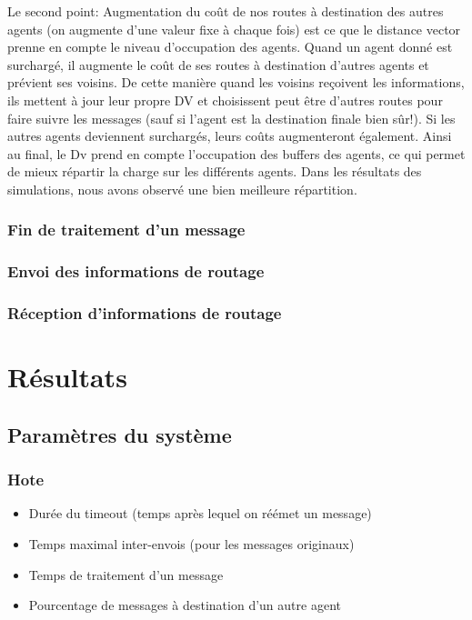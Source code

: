 \documentclass[a4paper,11pt]{article}
\begin{document}
Le second point: \og Augmentation du coût de nos routes à destination des autres agents (on augmente d'une valeur fixe à chaque fois) \fg est ce que le distance vector prenne en compte le niveau d'occupation des agents. Quand un agent donné est surchargé, il augmente le coût de ses routes à destination d'autres agents et prévient ses voisins. De cette manière quand les voisins reçoivent les informations, ils mettent à jour leur propre DV et choisissent peut être d'autres routes pour faire suivre les messages (sauf si l'agent est la destination finale bien sûr!). Si les autres agents deviennent surchargés, leurs coûts augmenteront également. Ainsi au final, le Dv prend en compte l'occupation des buffers des agents, ce qui permet de mieux répartir la charge sur les différents agents. Dans les résultats des simulations, nous avons observé une bien meilleure répartition.


\subsubsection{Fin de traitement d'un message}
\subsubsection{Envoi des informations de routage}
\subsubsection{Réception d'informations de routage}


\section{Résultats}
\subsection{Paramètres du système}

\subsubsection{Hote}
\begin{itemize}
 \item Durée du timeout (temps après lequel on réémet un message)
 \item Temps maximal inter-envois (pour les messages originaux)
 \item Temps de traitement d'un message
 \item Pourcentage de messages à destination d'un autre agent
\end{itemize}
\end{document}
